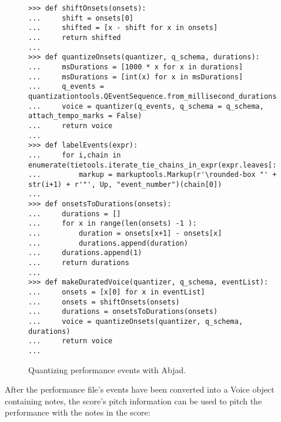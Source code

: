 \begin{figure}[H]
\begin{lstlisting}[basicstyle=\scriptsize\ttfamily, breaklines=True, tabsize=4, showtabs=false, showspaces=false]
>>> def shiftOnsets(onsets):
...     shift = onsets[0]
...     shifted = [x - shift for x in onsets]
...     return shifted
... 
>>> def quantizeOnsets(quantizer, q_schema, durations):
...     msDurations = [1000 * x for x in durations]
...     msDurations = [int(x) for x in msDurations]
...     q_events = quantizationtools.QEventSequence.from_millisecond_durations(msDurations)
...     voice = quantizer(q_events, q_schema = q_schema, attach_tempo_marks = False)
...     return voice
... 
>>> def labelEvents(expr):
...     for i,chain in enumerate(tietools.iterate_tie_chains_in_expr(expr.leaves[:-1])):
...         markup = markuptools.Markup(r'\rounded-box "' + str(i+1) + r'"', Up, "event_number")(chain[0])
... 
>>> def onsetsToDurations(onsets):
...     durations = []
...     for x in range(len(onsets) -1 ):
...         duration = onsets[x+1] - onsets[x]
...         durations.append(duration)
...     durations.append(1)
...     return durations
... 
>>> def makeDuratedVoice(quantizer, q_schema, eventList):
...     onsets = [x[0] for x in eventList] 
...     onsets = shiftOnsets(onsets)
...     durations = onsetsToDurations(onsets)
...     voice = quantizeOnsets(quantizer, q_schema, durations)
...     return voice
... \end{lstlisting}

\caption{Quantizing performance events with Abjad. } 
\end{figure}

After the performance file's events have been converted into a Voice object containing notes, the score's pitch information can be used to pitch the performance with the notes in the score:

